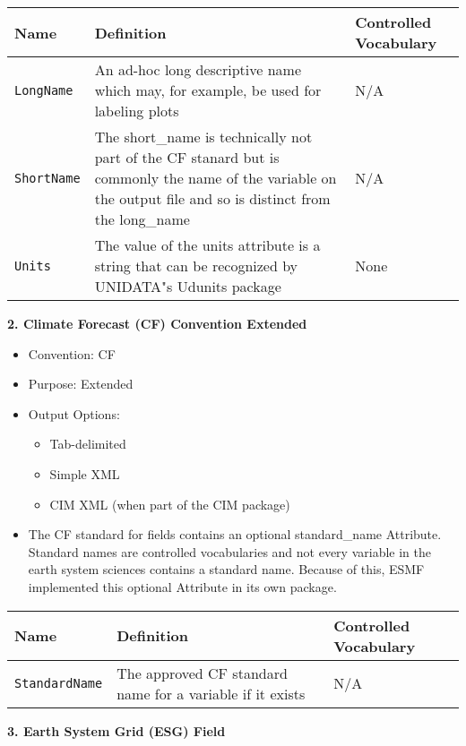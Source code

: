 \begin{tabular}{|p{8cm}|p{20cm}|p{10cm}|}
    {\bf Name } & {\bf Definition} & {\bf Controlled Vocabulary} \\
    \hline\hline
    {\tt LongName} & An ad-hoc long descriptive name which may, for example, be used for labeling plots & N/A\\
    {\tt ShortName}  & The short\_name is technically not part of the CF stanard but is commonly the name of the variable on the output file and so is distinct from the long\_name & N/A \\
    {\tt Units}  & The value of the units attribute is a string that can be recognized by UNIDATA"s Udunits package & None\\
\end{tabular}

\vspace{.20in}
{\bf 2. Climate Forecast (CF) Convention Extended}

\begin{itemize}
    \item Convention: CF
    \item Purpose: Extended
    \item Output Options: 
    \begin{itemize}
        \item Tab-delimited
        \item Simple XML
        \item CIM XML (when part of the CIM package)
    \end{itemize} 
    \item The CF standard for fields contains an optional standard\_name Attribute. Standard names are controlled vocabularies and not every variable in the earth system sciences contains a standard name. Because of this, ESMF implemented this optional Attribute in its own package.
\end{itemize}

\begin{tabular}{|p{8cm}|p{20cm}|p{10cm}|}
    {\bf Name } & {\bf Definition} & {\bf Controlled Vocabulary} \\
    \hline\hline
    {\tt StandardName} & The approved CF standard name for a variable if it exists &  N/A\\
\end{tabular}



\vspace{.20in}
{\bf 3. Earth System Grid (ESG) Field}

